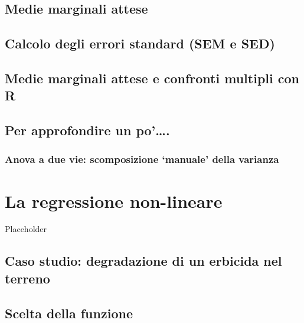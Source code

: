 \documentclass[a4paper,12pt,oneside]{book}
\begin{document}
\hypertarget{medie-marginali-attese-1}{%
\section{Medie marginali attese}\label{medie-marginali-attese-1}}

\hypertarget{calcolo-degli-errori-standard-sem-e-sed}{%
\section{Calcolo degli errori standard (SEM e SED)}\label{calcolo-degli-errori-standard-sem-e-sed}}

\hypertarget{medie-marginali-attese-e-confronti-multipli-con-r}{%
\section{Medie marginali attese e confronti multipli con R}\label{medie-marginali-attese-e-confronti-multipli-con-r}}

\hypertarget{per-approfondire-un-po.}{%
\section{Per approfondire un po'\ldots.}\label{per-approfondire-un-po.}}

\hypertarget{anova-a-due-vie-scomposizione-manuale-della-varianza}{%
\subsection{Anova a due vie: scomposizione `manuale' della varianza}\label{anova-a-due-vie-scomposizione-manuale-della-varianza}}

\hypertarget{la-regressione-non-lineare}{%
\chapter{La regressione non-lineare}\label{la-regressione-non-lineare}}

Placeholder

\hypertarget{caso-studio-degradazione-di-un-erbicida-nel-terreno}{%
\section{Caso studio: degradazione di un erbicida nel terreno}\label{caso-studio-degradazione-di-un-erbicida-nel-terreno}}

\hypertarget{scelta-della-funzione}{%
\section{Scelta della funzione}\label{scelta-della-funzione}}
\end{document}
